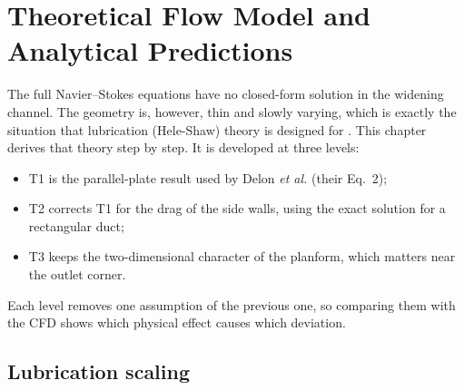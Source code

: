 \chapter{Theoretical Flow Model and Analytical Predictions}
\label{ch:theory}

The full Navier--Stokes equations have no closed-form solution in the widening channel. The geometry is, however, thin and slowly varying, which is exactly the situation that lubrication (Hele-Shaw) theory is designed for \citep{Batchelor1967,Bruus2008}. This chapter derives that theory step by step. It is developed at three levels:
\begin{itemize}
\item T1 is the parallel-plate result used by Delon \emph{et al.} (their Eq.~2);
\item T2 corrects T1 for the drag of the side walls, using the exact solution for a rectangular duct;
\item T3 keeps the two-dimensional character of the planform, which matters near the outlet corner.
\end{itemize}
Each level removes one assumption of the previous one, so comparing them with the CFD shows which physical effect causes which deviation.

\section{Lubrication scaling}
\label{sec:th_scaling}

